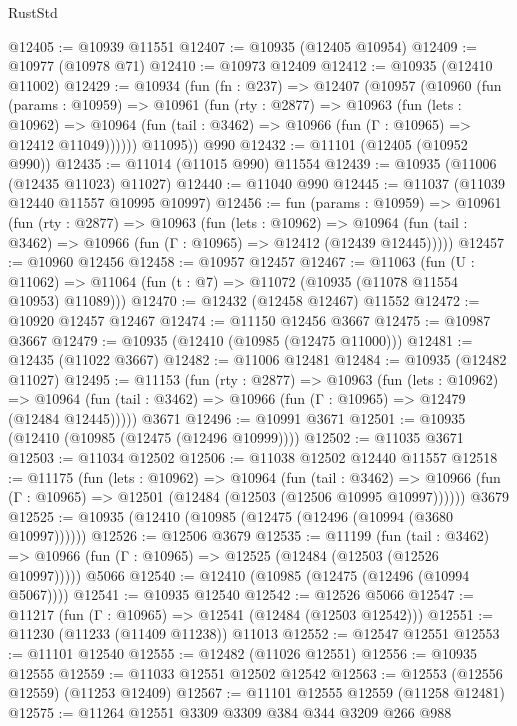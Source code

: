 \begin{lexlean}{RustStd}
\begin{coremodule}
{{{{{{{{{{{{{{{{{{{@12405 := @10939 @11551
@12407 := @10935 (@12405 @10954)
@12409 := @10977 (@10978 @71)
@12410 := @10973 @12409
@12412 := @10935 (@12410 @11002)
@12429 := @10934
    (fun (fn : @237) =>
    @12407
      (@10957
        (@10960
          (fun (params : @10959) =>
          @10961
            (fun (rty : @2877) =>
            @10963
              (fun (lets : @10962) =>
              @10964 (fun (tail : @3462) => @10966 (fun (Γ : @10965) => @12412 @11049))))))
        @11095))
    @990
@12432 := @11101 (@12405 (@10952 @990))
@12435 := @11014 (@11015 @990) @11554
@12439 := @10935 (@11006 (@12435 @11023) @11027)
@12440 := @11040 @990
@12445 := @11037 (@11039 @12440 @11557 @10995 @10997)
@12456 := fun (params : @10959) =>
  @10961
    (fun (rty : @2877) =>
    @10963
      (fun (lets : @10962) =>
      @10964 (fun (tail : @3462) => @10966 (fun (Γ : @10965) => @12412 (@12439 @12445)))))
@12457 := @10960 @12456
@12458 := @10957 @12457
@12467 := @11063
    (fun (U : @11062) => @11064 (fun (t : @7) => @11072 (@10935 (@11078 @11554 @10953) @11089)))
@12470 := @12432 (@12458 @12467) @11552
@12472 := @10920 @12457 @12467
@12474 := @11150 @12456 @3667
@12475 := @10987 @3667
@12479 := @10935 (@12410 (@10985 (@12475 @11000)))
@12481 := @12435 (@11022 @3667)
@12482 := @11006 @12481
@12484 := @10935 (@12482 @11027)
@12495 := @11153
    (fun (rty : @2877) =>
    @10963
      (fun (lets : @10962) =>
      @10964 (fun (tail : @3462) => @10966 (fun (Γ : @10965) => @12479 (@12484 @12445)))))
    @3671
@12496 := @10991 @3671
@12501 := @10935 (@12410 (@10985 (@12475 (@12496 @10999))))
@12502 := @11035 @3671
@12503 := @11034 @12502
@12506 := @11038 @12502 @12440 @11557
@12518 := @11175
    (fun (lets : @10962) =>
    @10964
      (fun (tail : @3462) =>
      @10966 (fun (Γ : @10965) => @12501 (@12484 (@12503 (@12506 @10995 @10997))))))
    @3679
@12525 := @10935 (@12410 (@10985 (@12475 (@12496 (@10994 (@3680 @10997))))))
@12526 := @12506 @3679
@12535 := @11199
    (fun (tail : @3462) => @10966 (fun (Γ : @10965) => @12525 (@12484 (@12503 (@12526 @10997)))))
    @5066
@12540 := @12410 (@10985 (@12475 (@12496 (@10994 @5067))))
@12541 := @10935 @12540
@12542 := @12526 @5066
@12547 := @11217 (fun (Γ : @10965) => @12541 (@12484 (@12503 @12542)))
@12551 := @11230 (@11233 (@11409 @11238)) @11013
@12552 := @12547 @12551
@12553 := @11101 @12540
@12555 := @12482 (@11026 @12551)
@12556 := @10935 @12555
@12559 := @11033 @12551 @12502 @12542
@12563 := @12553 (@12556 @12559) (@11253 @12409)
@12567 := @11101 @12555 @12559 (@11258 @12481)
@12575 := @11264 @12551 @3309 @3309 @384 @344 @3209 @266 @988
}}}}}}}}}}}}}}}}}}}
\end{coremodule}
\end{lexlean}
